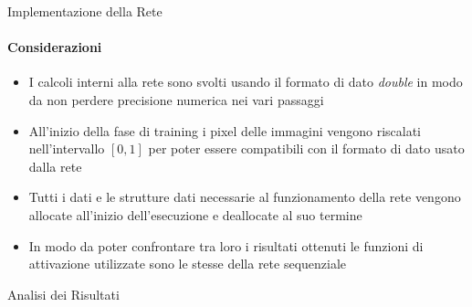 \documentclass[
 ]{beamer}
\begin{document}
\begin{frame}{Implementazione della Rete}
    \framesubtitle{Considerazioni}
    \begin{itemize} [<+->]
        \setlength\itemsep{1em}
        \item \large I calcoli interni alla rete sono svolti usando il formato di dato \emph{double} in modo da non perdere precisione numerica nei vari passaggi
        \item \large All'inizio della fase di training i pixel delle immagini vengono riscalati nell'intervallo $[0,1]$ per poter essere compatibili con il formato di dato usato dalla rete
        \item \large Tutti i dati e le strutture dati necessarie al funzionamento della rete vengono allocate all'inizio dell'esecuzione e deallocate al suo termine
        \item \large In modo da poter confrontare tra loro i risultati ottenuti le funzioni di attivazione utilizzate sono le stesse della rete sequenziale
    \end{itemize} 
    
\end{frame}



\begin{frame}[c]
  \centering
  \bigskip \bigskip    
  \Huge Analisi dei Risultati
\end{frame}
\end{document}
